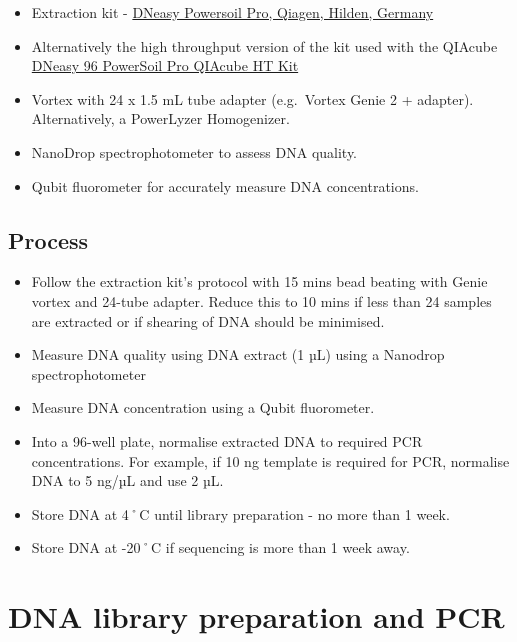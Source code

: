 \documentclass[
]{book}
\providecommand{\tightlist}{%
  \setlength{\itemsep}{0pt}\setlength{\parskip}{0pt}}
\begin{document}
\begin{itemize}
\tightlist
\item
  Extraction kit - \href{https://www.qiagen.com/au/resources/resourcedetail?id=9bb59b74-e493-4aeb-b6c1-f660852e8d97&lang=en}{DNeasy Powersoil Pro, Qiagen, Hilden, Germany}
\item
  Alternatively the high throughput version of the kit used with the QIAcube \href{https://rmiteduau-my.sharepoint.com/personal/christian_krohn_rmit_edu_au/Documents/Experiments/2025_ETPSequencingProject/_\%09https:/www.qiagen.com/au/products/discovery-and-translational-research/dna-rna-purification/dna-purification/microbial-dna/dneasy-96-powersoil-pro-qiacube-ht-kit}{DNeasy 96 PowerSoil Pro QIAcube HT Kit}
\item
  Vortex with 24 x 1.5 mL tube adapter (e.g.~Vortex Genie 2 + adapter). Alternatively, a PowerLyzer Homogenizer.
\item
  NanoDrop spectrophotometer to assess DNA quality.
\item
  Qubit fluorometer for accurately measure DNA concentrations.
\end{itemize}

\subsection{Process}\label{process}

\begin{itemize}
\tightlist
\item
  Follow the extraction kit's protocol with 15 mins bead beating with Genie vortex and 24-tube adapter. Reduce this to 10 mins if less than 24 samples are extracted or if shearing of DNA should be minimised.
\item
  Measure DNA quality using DNA extract (1 µL) using a Nanodrop spectrophotometer
\item
  Measure DNA concentration using a Qubit fluorometer.
\item
  Into a 96-well plate, normalise extracted DNA to required PCR concentrations. For example, if 10 ng template is required for PCR, normalise DNA to 5 ng/µL and use 2 µL.\\
\item
  Store DNA at 4˚C until library preparation - no more than 1 week.
\item
  Store DNA at -20˚C if sequencing is more than 1 week away.
\end{itemize}

\section{DNA library preparation and PCR}\label{dna-library-preparation-and-pcr}
\end{document}
